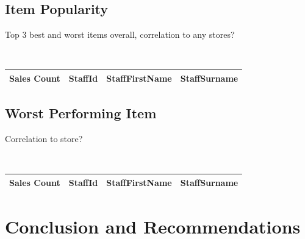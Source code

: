 \documentclass{article}
\begin{document}
            \subsection{Item Popularity}
                Top 3 best and worst items overall, correlation to any stores?

                \begin{lstlisting}
                   
                \end{lstlisting}

                \begin{table}[H]
                    \centering
                    \begin{tabular}{|l|l|l|l|}
                    \hline
                    Sales Count & StaffId & StaffFirstName & StaffSurname \\ \hline
                    \end{tabular}
                    \end{table}

            \subsection{Worst Performing Item}
                Correlation to store?

                \begin{lstlisting}
                    
                \end{lstlisting}

                \begin{table}[H]
                    \centering
                    \begin{tabular}{|l|l|l|l|}
                    \hline
                    Sales Count & StaffId & StaffFirstName & StaffSurname \\ \hline
                    \end{tabular}
                    \end{table}
	\newpage
    \section{Conclusion and Recommendations}
           
\end{document}
